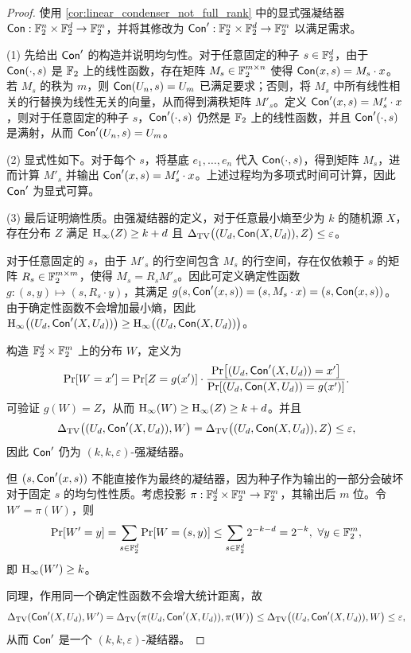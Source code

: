 \begin{proof}
    使用 \cref{cor:linear_condenser_not_full_rank} 中的显式强凝结器 $\mathsf{Con} : \mathbb{F}_2^n \times \mathbb{F}_2^d \to \mathbb{F}_2^m$，并将其修改为 $\mathsf{Con}' : \mathbb{F}_2^n \times \mathbb{F}_2^d \to \mathbb{F}_2^m$ 以满足需求。

    (1) 先给出 $\mathsf{Con}'$ 的构造并说明均匀性。对于任意固定的种子 $s \in \mathbb{F}_2^d$，由于 $\mathsf{Con}(\cdot ,s)$ 是 $\mathbb{F}_2$ 上的线性函数，存在矩阵 $M_s \in \mathbb{F}_2^{m \times n}$ 使得 $\mathsf{Con}(x,s) = M_s \cdot x$。若 $M_s$ 的秩为 $m$，则 $\mathsf{Con}(U_n, s) = U_m$ 已满足要求；否则，将 $M_s$ 中所有线性相关的行替换为线性无关的向量，从而得到满秩矩阵 $M'_s$。定义 $\mathsf{Con}'(x, s) = M'_s \cdot x$，则对于任意固定的种子 $s$，$\mathsf{Con}'(\cdot ,s)$ 仍然是 $\mathbb{F}_2$ 上的线性函数，并且 $\mathsf{Con}'(\cdot, s)$ 是满射，从而 $\mathsf{Con}'(U_n, s) = U_m$。

    (2) 显式性如下。对于每个 $s$，将基底 $e_1, \ldots, e_n$ 代入 $\mathsf{Con}(\cdot, s)$，得到矩阵 $M_s$，进而计算 $M'_s$ 并输出 $\mathsf{Con}'(x, s) = M'_s \cdot x$。上述过程均为多项式时间可计算，因此 $\mathsf{Con}'$ 为显式可算。

    (3) 最后证明熵性质。由强凝结器的定义，对于任意最小熵至少为 $k$ 的随机源 $X$，存在分布 $Z$ 满足 $\mathrm{H}_\infty(Z) \ge k + d$ 且 $\Delta_{\mathrm{TV}}\big((U_d, \mathsf{Con}(X, U_d)), Z\big) \le \varepsilon$。

    对于任意固定的 $s$，由于 $M'_s$ 的行空间包含 $M_s$ 的行空间，存在仅依赖于 $s$ 的矩阵 $R_s \in \mathbb{F}_2^{m \times m}$，使得 $M_s = R_s M'_s$。因此可定义确定性函数 $g : (s, y) \mapsto (s, R_s \cdot y)$，其满足
    $g(s, \mathsf{Con}'(x, s)) = (s, M_s \cdot x) = (s, \mathsf{Con}(x, s))$。
    由于确定性函数不会增加最小熵，因此
    $\mathrm{H}_\infty\big((U_d, \mathsf{Con}'(X, U_d))\big) \ge \mathrm{H}_\infty\big((U_d, \mathsf{Con}(X, U_d))\big)$。

    构造 $\mathbb{F}_2^d \times \mathbb{F}_2^m$ 上的分布 $W$，定义为
    $$
    \Pr[W = x'] = \Pr[Z = g(x')] \cdot \frac{\Pr[(U_d, \mathsf{Con}'(X, U_d)) = x']}{\Pr[(U_d, \mathsf{Con}(X, U_d)) = g(x')]}.
    $$
    可验证 $g(W) = Z$，从而 $\mathrm{H}_\infty(W) \ge \mathrm{H}_\infty(Z) \ge k + d$。并且
    $$
    \Delta_{\mathrm{TV}}\big((U_d, \mathsf{Con}'(X, U_d)), W\big) = \Delta_{\mathrm{TV}}\big((U_d, \mathsf{Con}(X, U_d)), Z\big) \le \varepsilon,
    $$
    因此 $\mathsf{Con}'$ 仍为 $(k, k, \varepsilon)$-强凝结器。

    但 $(s, \mathsf{Con}'(x, s))$ 不能直接作为最终的凝结器，因为种子作为输出的一部分会破坏对于固定 $s$ 的均匀性性质。考虑投影 $\pi : \mathbb{F}_2^d \times \mathbb{F}_2^m \to \mathbb{F}_2^m$，其输出后 $m$ 位。令 $W' = \pi(W)$，则
    $$
    \Pr[W' = y] = \sum_{s \in \mathbb{F}_2^d} \Pr[W = (s, y)] \le \sum_{s \in \mathbb{F}_2^d} 2^{-k - d} = 2^{-k},\ \forall y \in \mathbb{F}_2^m,
    $$
    即 $\mathrm{H}_\infty(W') \ge k$。

    同理，作用同一个确定性函数不会增大统计距离，故
    $$
    \Delta_{\mathrm{TV}}(\mathsf{Con}'(X, U_d), W') = \Delta_{\mathrm{TV}}\big( \pi(U_d, \mathsf{Con}'(X, U_d)), \pi(W) \big) \le \Delta_{\mathrm{TV}}\big((U_d, \mathsf{Con}'(X, U_d)), W\big) \le \varepsilon,
    $$
    从而 $\mathsf{Con}'$ 是一个 $(k, k, \varepsilon)$-凝结器。
\end{proof}

